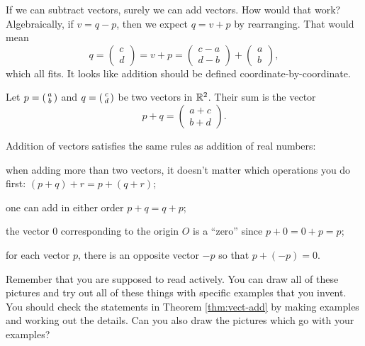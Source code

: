 \documentclass[elementsmain.tex]{subfiles}
\begin{document}
If we can subtract vectors, surely we can add vectors. How would that work? Algebraically, if $v=q-p$, then we expect $q=v+p$ by rearranging.
That would mean
\[
q = \begin{pmatrix} c \\ d \end{pmatrix} = v+p = \begin{pmatrix} c-a \\ d-b \end{pmatrix} + \begin{pmatrix} a \\ b \end{pmatrix},
\]
which all fits. It looks like addition should be defined coordinate-by-coordinate.

\begin{definition}
Let $p = \left(\begin{smallmatrix} a \\ b \end{smallmatrix}\right)$ and $q= \left(\begin{smallmatrix} c \\ d \end{smallmatrix}\right)$ be two vectors in $\mathbb{R}^2$. Their sum is the vector
\[
p+q = \begin{pmatrix} a+c \\ b+d\end{pmatrix}.
\]
\end{definition}

\begin{theorem}\label{thm:vect-add}
Addition of vectors satisfies the same rules as addition of real numbers:
\begin{compactitem}
\item when adding more than two vectors, it doesn't matter which operations you do first:
$(p+q)+r = p + (q+r)$;
\item one can add in either order $p+q = q+p$;
\item the vector $0$ corresponding to the origin $O$ is a ``zero'' since $p+0 = 0+p = p$;
\item for each vector $p$, there is an opposite vector $-p$ so that $p + (-p) = 0$.
\end{compactitem}
\end{theorem}

\begin{readingex}
Remember that you are supposed to read actively.
You can draw all of these pictures and try out all of these things with specific examples that you invent.
You should check the statements in Theorem \ref{thm:vect-add} by making examples and working out the details.
Can you also draw the pictures which go with your examples?
\end{readingex}
\end{document}
